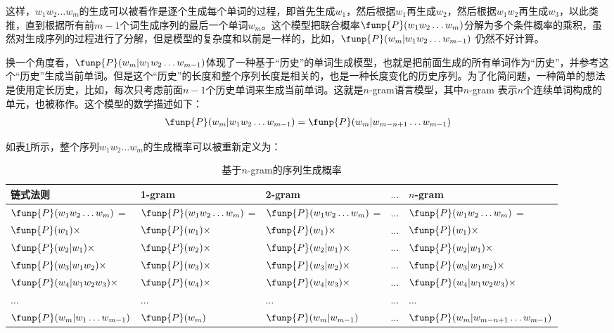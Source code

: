 \parinterval 这样，$w_1 w_2 \ldots w_m$的生成可以被看作是逐个生成每个单词的过程，即首先生成$w_1$，然后根据$w_1$再生成$w_2$，然后根据$w_1 w_2$再生成$w_3$，以此类推，直到根据所有前$m-1$个词生成序列的最后一个单词$w_m$。这个模型把联合概率$\funp{P}(w_1 w_2 \ldots w_m)$分解为多个条件概率的乘积，虽然对生成序列的过程进行了分解，但是模型的复杂度和以前是一样的，比如，$\funp{P}(w_m|w_1 w_2 \ldots w_{m-1})$ 仍然不好计算。

\parinterval 换一个角度看，$\funp{P}(w_m|w_1 w_2 \ldots w_{m-1})$体现了一种基于“历史”的单词生成模型，也就是把前面生成的所有单词作为“历史”，并参考这个“历史”生成当前单词。但是这个“历史”的长度和整个序列长度是相关的，也是一种长度变化的历史序列。为了化简问题，一种简单的想法是使用定长历史，比如，每次只考虑前面$n-1$个历史单词来生成当前单词。这就是$n$-gram语言模型，其中$n$-gram 表示$n$个连续单词构成的单元，也被称作{\small{}}。这个模型的数学描述如下：
\begin{eqnarray}
\funp{P}(w_m|w_1 w_2 \ldots w_{m-1}) = \funp{P}(w_m|w_{m-n+1} \ldots w_{m-1})
\label{eq:2-23}
\end{eqnarray}

\parinterval 如表\ref{tab:2-2}所示，整个序列$w_1 w_2 \ldots w_m$的生成概率可以被重新定义为：

\begin{table}[htp]{
\begin{center}
\caption{基于$n$-gram的序列生成概率}
{\footnotesize
\begin{tabular}{l|l|l |l|l}
链式法则 & 1-gram & 2-gram & $ \ldots $ & $n$-gram\\
 \hline
\rule{0pt}{10pt} $\funp{P}(w_1 w_2 \ldots w_m)$ = & $\funp{P}(w_1 w_2 \ldots w_m)$ = & $\funp{P}(w_1 w_2 \ldots w_m)$ = & $ \ldots $ & $\funp{P}(w_1 w_2 \ldots w_m)$ = \\
\rule{0pt}{10pt} $\funp{P}(w_1)\times$ & $\funp{P}(w_1)\times$ & $\funp{P}(w_1)\times$  & $ \ldots $ & $\funp{P}(w_1)\times$ \\
\rule{0pt}{10pt} $\funp{P}(w_2|w_1)\times$ & $\funp{P}(w_2)\times$ & $\funp{P}(w_2|w_1)\times$ & $ \ldots $ & $\funp{P}(w_2|w_1)\times$\\
\rule{0pt}{10pt} $\funp{P}(w_3|w_1 w_2)\times$ & $\funp{P}(w_3)\times$ & $\funp{P}(w_3|w_2)\times$ & $ \ldots $ & $\funp{P}(w_3|w_1 w_2)\times$ \\
\rule{0pt}{10pt} $\funp{P}(w_4|w_1 w_2 w_3)\times$ & $\funp{P}(w_4)\times$ & $\funp{P}(w_4|w_3)\times$ & $ \ldots $ & $\funp{P}(w_4|w_1 w_2 w_3)\times$ \\
\rule{0pt}{10pt} $ \ldots $ & $ \ldots $ & $ \ldots $ & $ \ldots $ & $ \ldots $ \\
\rule{0pt}{10pt} $\funp{P}(w_m|w_1  \ldots  w_{m-1})$ & $\funp{P}(w_m)$ & $\funp{P}(w_m|w_{m-1})$ & $ \ldots $ & $\funp{P}(w_m|w_{m-n+1}  \ldots  w_{m-1})$
\end{tabular}
}
\label{tab:2-2}
\end{center}
}
\end{table}

